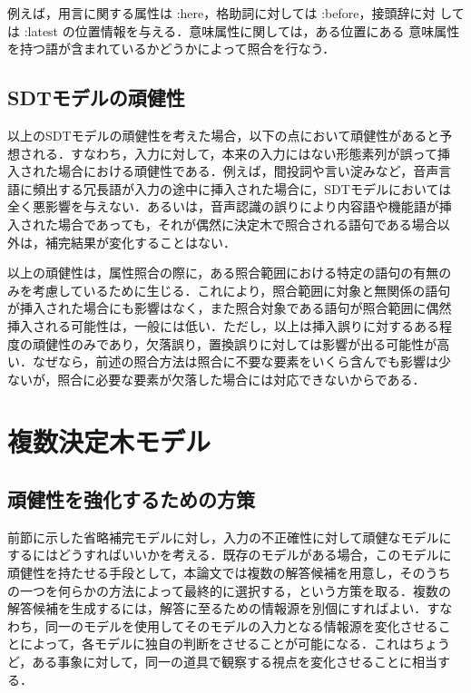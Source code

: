 例えば，用言に関する属性は :here，格助詞に対しては :before，接頭辞に対
しては :latest の位置情報を与える．意味属性に関しては，ある位置にある
意味属性を持つ語が含まれているかどうかによって照合を行なう．


\subsection{SDTモデルの頑健性}

以上のSDTモデルの頑健性を考えた場合，以下の点において頑健性があると予
想される．すなわち，入力に対して，本来の入力にはない形態素列が誤って挿
入された場合における頑健性である．例えば，間投詞や言い淀みなど，音声言
語に頻出する冗長語が入力の途中に挿入された場合に，SDTモデルにおいては
全く悪影響を与えない．あるいは，音声認識の誤りにより内容語や機能語が挿
入された場合であっても，それが偶然に決定木で照合される語句である場合以
外は，補完結果が変化することはない．

以上の頑健性は，属性照合の際に，ある照合範囲における特定の語句の有無の
みを考慮しているために生じる．これにより，照合範囲に対象と無関係の語句
が挿入された場合にも影響はなく，また照合対象である語句が照合範囲に偶然
挿入される可能性は，一般には低い．ただし，以上は挿入誤りに対するある程
度の頑健性のみであり，欠落誤り，置換誤りに対しては影響が出る可能性が高
い．なぜなら，前述の照合方法は照合に不要な要素をいくら含んでも影響は少
ないが，照合に必要な要素が欠落した場合には対応できないからである．



\section{複数決定木モデル}

\subsection{頑健性を強化するための方策}

前節に示した省略補完モデルに対し，入力の不正確性に対して頑健なモデルに
するにはどうすればいいかを考える．既存のモデルがある場合，このモデルに
頑健性を持たせる手段として，本論文では複数の解答候補を用意し，そのうち
の一つを何らかの方法によって最終的に選択する，という方策を取る．複数の
解答候補を生成するには，解答に至るための情報源を別個にすればよい．すな
わち，同一のモデルを使用してそのモデルの入力となる情報源を変化させるこ
とによって，各モデルに独自の判断をさせることが可能になる．これはちょう
ど，ある事象に対して，同一の道具で観察する視点を変化させることに相当す
る．

